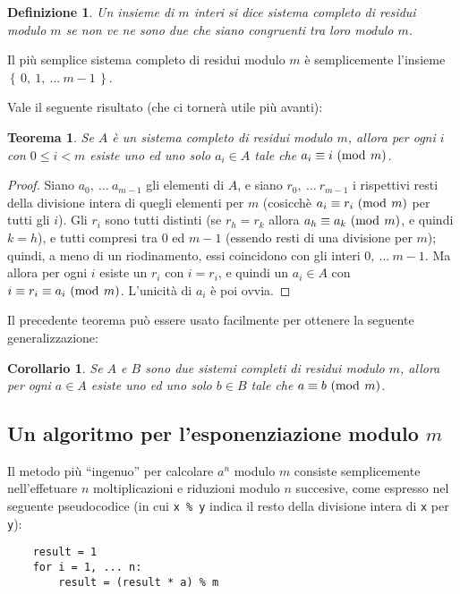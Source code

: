 \documentclass[pdflatex,11pt,a4paper,oneside]{article}
\newcommand{\congruent}[0]{\equiv}
\newcommand{\mmodop}[0]{\ensuremath{\operatorname{mod}}}
\newcommand{\mmod}[1]{\ensuremath{\allowbreak\ (\mmodop\:{#1})}}
\newcommand{\set}[1]{\ensuremath{\left\{\,{#1}\,\right\}}}
\newtheorem{theorem}[TheoremLike]{Teorema}
\newtheorem{definition}[TheoremLike]{Definizione}
\newtheorem{corollary}[TheoremLike]{Corollario}
\begin{document}
\begin{definition}
Un insieme di $m$ interi si dice \emph{sistema completo di residui modulo
$m$} se non ve ne sono due che siano congruenti tra loro modulo $m$.
\end{definition}

Il pi\`u semplice sistema completo di residui modulo $m$ \`e semplicemente
l'insieme $\set{0,\: 1,\: \ldots\: m - 1}$.

\smallskip
Vale il seguente risultato (che ci torner\`a utile pi\`u avanti):
%
\begin{theorem}\label{thm:complete-residue-system}
Se $A$ \`e un sistema completo di residui modulo $m$, allora per ogni
$i$ con $0 \leq i < m$ esiste uno ed uno solo $a_i \in A$ tale che
$a_i \congruent i \mmod m$.
\end{theorem}
%
\begin{proof}
Siano $a_0,\: \ldots\: a_{m-1}$ gli elementi di $A$, e siano $r_0,\:
\ldots\: r_{m-1}$ i rispettivi resti della divisione intera di quegli
elementi per $m$ (cosicch\`e $a_i \congruent r_i \mmod m$ per tutti
gli $i$).  Gli $r_i$ sono tutti distinti (se $r_h = r_k$ allora
$a_h \congruent a_k \mmod m$, e quindi $k = h$), e tutti compresi tra
$0$ ed $m - 1$ (essendo resti di una divisione per $m$); quindi, a
meno di un riodinamento, essi coincidono con gli interi $0,\: \ldots\:
m -1$.  Ma allora per ogni $i$ esiste un $r_i$ con $i = r_i$, e quindi
un $a_i \in A$ con $i \congruent r_i \congruent a_i \mmod m$.
L'unicit\`a di $a_i$ \`e poi ovvia.
\end{proof}

Il precedente teorema pu\`o essere usato facilmente per ottenere la
seguente generalizzazione:
%
\begin{corollary}\label{cor:complete-residue-system-basic}
Se $A$ e $B$ sono due sistemi completi di residui modulo $m$, allora per
ogni $a \in A$ esiste uno ed uno solo $b \in B$ tale che $a \congruent b
\mmod m$.
\end{corollary}


\subsection{Un algoritmo per l'esponenziazione modulo $m$}

Il metodo pi\`u ``ingenuo'' per calcolare $a^n$ modulo $m$ consiste
semplicemente nell'effetuare $n$ moltiplicazioni e riduzioni modulo $n$
succesive, come espresso nel seguente pseudocodice (in cui \verb|x % y|
indica il resto della divisione intera di \verb|x| per \verb|y|):
%
\begin{verbatim}
    result = 1
    for i = 1, ... n:
        result = (result * a) % m
\end{verbatim}
\end{document}
